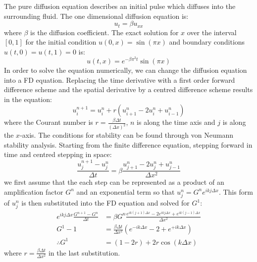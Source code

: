 \documentclass[twocolumn]{article}
\begin{document}
The pure diffusion equation describes an initial pulse which diffuses into
the surrounding fluid. The one dimensional diffusion equation is:
\begin{equation}
  u_t = \beta u_{xx}
\end{equation}
where $\beta$ is the diffusion coefficient. The exact solution for $x$ over the
interval $\left[0, 1 \right]$ for the initial condition $u(0, x) = \sin(\pi x)$ and
boundary conditions $u(t, 0) = u(t, 1) = 0$ is:
\begin{equation}
  \label{eq:diffusion}
  u(t, x) = e^{- \beta \pi^2 t} \sin(\pi x)
\end{equation}
In order to solve the equation numerically, we can change the diffusion equation
into a FD equation. Replacing the time derivative with a first order forward
difference scheme and the spatial derivative by a centred difference scheme
results in the equation:
\begin{equation}
  u_i^{n+1} = u_i^n + r \left( u_{i+1}^n - 2 u_i^n + u_{i-1}^n \right)
\end{equation}
where the Courant number is $r = \frac{\beta \Delta t}{(\Delta x)^2}$,
  $n$ is along the time axis and $j$ is along the $x$-axis.
The conditions for stability can be found through von Neumann
stability analysis. Starting from the finite difference equation,
stepping forward in time and centred stepping in space:
\begin{equation}
  \frac{u_j^{n+1} - u_j^n}{\Delta t} = \beta \frac{u_{j+1}^n - 2 u_j^n
    + u_{j-1}^n}{\Delta x^2}
\end{equation}
we first assume that the each step can be represented as a product of
an amplification factor $G^n$ and an exponential term so that $u_j^n =
G^n e^{i k j \Delta x}$. This form of $u_j^n$ is then substituted into
the FD equation and solved for $G^1$:
\begin{equation}
  \begin{aligned}
    e^{i k j \Delta x} \frac{G^{n+1} - G^n}{\Delta t} &= \beta G^n
    \frac{e^{i k (j + 1) \Delta x} - 2 e^{i k j \Delta x} + e^{i k (j
        - 1) \Delta x}}{\Delta x^2} \\
    G^1 - 1 &= \frac{\beta \Delta t}{\Delta x^2} \left(e^{- i k \Delta
        x} - 2 + e^{+ i k \Delta x} \right) \\
    \therefore G^1 &= \left( 1 - 2 r \right) + 2 r \cos(k \Delta x)
  \end{aligned}
\end{equation}
where $r = \frac{\beta \Delta t}{\Delta x^2}$ in the last
substitution.
\end{document}

